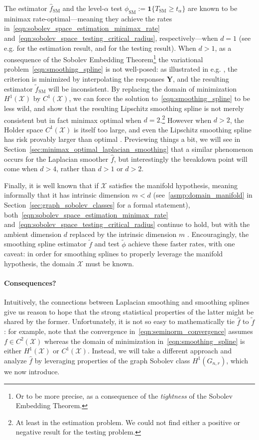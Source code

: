 \documentclass{article}
\newcommand{\1}{\mathbf{1}}
\newcommand{\Xset}{\mathcal{X}}
\newcommand{\wt}[1]{\widetilde{#1}}
\newcommand{\wh}[1]{\widehat{#1}}
\newcommand{\SM}{\mathrm{SM}}
\theoremstyle{alden}
\theoremstyle{aldenthm}
\theoremstyle{definition}
\theoremstyle{remark}
\begin{document}
The estimator $\wh{f}_{\SM}$ and the level-$\alpha$ test $\phi_{\SM} := \1\{T_{\SM} \geq {t}_{\alpha}\}$ are known to be minimax rate-optimal---meaning they achieve the rates in~\eqref{eqn:sobolev_space_estimation_minimax_rate} and~\eqref{eqn:sobolev_space_testing_critical_radius}, respectively---when $d = 1$ (see e.g. \cite{vandergeer2000} for the estimation result, and \cite{liu2019} for the testing result). When $d > 1$, as a consequence of the Sobolev Embedding Theorem\footnote{Or to be more precise, as a consequence of the \emph{tightness} of the Sobolev Embedding Theorem.} the variational problem~\eqref{eqn:smoothing_spline} is not well-posed: as illustrated in e.g. \cite{green93}, the criterion is minimized by interpolating the responses $\mathbf{Y}$, and the resulting estimator $\wt{f}_{\SM}$ will be inconsistent. By replacing the domain of minimization $H^1(\Xset)$ by $C^1(\Xset)$, we can force the solution to~\eqref{eqn:smoothing_spline} to be less wild, and \cite{birge1993} show that the resulting Lipschitz smoothing spline is not merely consistent but in fact minimax optimal when $d = 2$.\footnote{At least in the estimation problem. We could not find either a positive or negative result for the testing problem.} However when $d > 2$, the Holder space $C^1(\Xset)$ is itself too large, and even the Lipschitz smoothing spline has risk provably larger than optimal \cite{birge1993}. Previewing things a bit, we will see in Section~\ref{sec:minimax_optimal_laplacian_smoothing} that a similar phenomenon occurs for the Laplacian smoother $\wh{f}$, but interestingly the breakdown point will come when $d > 4$, rather than $d > 1$ or $d > 2$.

Finally, it is well known that if $\Xset$ satisfies the manifold hypothesis, meaning informally that it has intrinsic dimension $m < d$ (see~\ref{asmp:domain_manifold} in Section~\ref{sec:graph_sobolev_classes} for a formal statement), both~\eqref{eqn:sobolev_space_estimation_minimax_rate} and~\eqref{eqn:sobolev_space_testing_critical_radius} continue to hold, but with the ambient dimension $d$ replaced by the intrinsic dimension $m$ \citep{bickel2007,ingster2000}. Encouragingly, the smoothing spline estimator $\wt{f}$ and test $\wt{\phi}$ achieve these faster rates, with one caveat: in order for smoothing splines to properly leverage the manifold hypothesis, the domain $\Xset$ must be known.

\paragraph{Consequences?} Intuitively, the connections between Laplacian smoothing and smoothing splines give us reason to hope that the strong statistical properties of the latter might be shared by the former. Unfortunately, it is not so easy to mathematically tie $\wh{f}$ to $\wt{f}$: for example, note that the convergence in~\eqref{eqn:seminorm_convergence} assumes $f \in C^2(\Xset)$ whereas the domain of minimization in~\eqref{eqn:smoothing_spline} is either $H^1(\Xset)$ or $C^1(\Xset)$. Instead, we will take a different approach and analyze $\wh{f}$ by leveraging properties of the graph Sobolev class $H^1(G_{n,r})$, which we now introduce.
\end{document}
